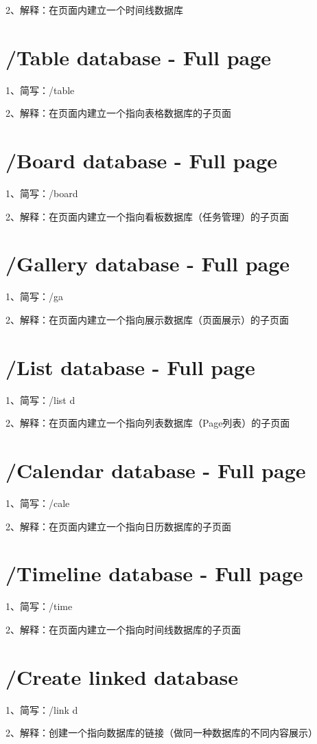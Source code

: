 2、解释：在页面内建立一个时间线数据库

\section{/Table database - Full page}

1、简写：/table

2、解释：在页面内建立一个指向表格数据库的子页面

\section{/Board database - Full page}

1、简写：/board

2、解释：在页面内建立一个指向看板数据库（任务管理）的子页面

\section{/Gallery database - Full page}

1、简写：/ga

2、解释：在页面内建立一个指向展示数据库（页面展示）的子页面

\section{/List database - Full page}

1、简写：/list d

2、解释：在页面内建立一个指向列表数据库（Page列表）的子页面

\section{/Calendar database - Full page}

1、简写：/cale

2、解释：在页面内建立一个指向日历数据库的子页面

\section{/Timeline database - Full page}

1、简写：/time

2、解释：在页面内建立一个指向时间线数据库的子页面

\section{/Create linked database}

1、简写：/link d

2、解释：创建一个指向数据库的链接（做同一种数据库的不同内容展示）

